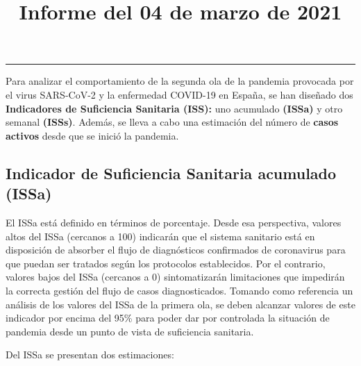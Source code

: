 \documentclass[
  11pt,
]{article}
\title{Informe del 04 de marzo de 2021}
\author{}
\date{\vspace{-2.5em}}
\begin{document}
\maketitle

\renewcommand{\figurename}{Figura}
\renewcommand{\tablename}{Tabla}

\tableofcontents

\vspace{.5cm}

\begin{center}\rule{0.5\linewidth}{0.5pt}\end{center}

\vspace{.5cm}

Para analizar el comportamiento de la segunda ola de la pandemia
provocada por el virus SARS-CoV-2 y la enfermedad COVID-19 en España, se
han diseñado dos \textbf{Indicadores de Suficiencia Sanitaria (ISS):}
uno acumulado \textbf{(ISSa)} y otro semanal \textbf{(ISSs)}. Además, se
lleva a cabo una estimación del número de \textbf{casos activos} desde
que se inició la pandemia.

\hypertarget{indicador-de-suficiencia-sanitaria-acumulado-issa}{%
\subsection{Indicador de Suficiencia Sanitaria acumulado
(ISSa)}\label{indicador-de-suficiencia-sanitaria-acumulado-issa}}

El ISSa está definido en términos de porcentaje. Desde esa perspectiva,
valores altos del ISSa (cercanos a 100) indicarán que el sistema
sanitario está en disposición de absorber el flujo de diagnósticos
confirmados de coronavirus para que puedan ser tratados según los
protocolos establecidos. Por el contrario, valores bajos del ISSa
(cercanos a 0) sintomatizarán limitaciones que impedirán la correcta
gestión del flujo de casos diagnosticados. Tomando como referencia un
análisis de los valores del ISSa de la primera ola, se deben alcanzar
valores de este indicador por encima del 95\% para poder dar por
controlada la situación de pandemia desde un punto de vista de
suficiencia sanitaria.

Del ISSa se presentan dos estimaciones:
\end{document}
